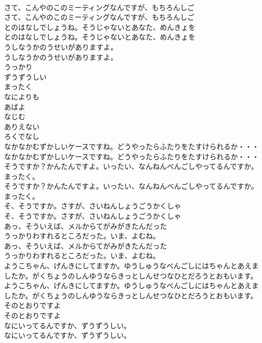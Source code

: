 \documentclass[8pt]{extreport}
\begin{document}
\begin{CJK}{UTF8}{min}
\\	さて、こんやのこのミーティングなんですが、もちろんしご
\\	さて、こんやのこのミーティングなんですが、もちろんしご
\\	とのはなしでしょうね。そうじゃないとあなた、めんきょを
\\	とのはなしでしょうね。そうじゃないとあなた、めんきょを
\\	うしなうかのうせいがありますよ。
\\	うしなうかのうせいがありますよ。
\\	うっかり
\\	ずうずうしい
\\	まったく
\\	なによりも
\\	あばよ
\\	なじむ
\\	ありえない
\\	ろくでなし
\\	なかなかむずかしいケースですね。どうやったらふたりをたすけられるか・・・
\\	なかなかむずかしいケースですね。どうやったらふたりをたすけられるか・・・
\\	そうですか？かんたんですよ。いったい、なんねんべんごしやってるんですか。まったく。
\\	そうですか？かんたんですよ。いったい、なんねんべんごしやってるんですか。まったく。
\\	そ、そうですか。さすが、さいねんしょうごうかくしゃ
\\	そ、そうですか。さすが、さいねんしょうごうかくしゃ
\\	あっ、そういえば、メルからてがみがきたんだった
\\	うっかりわすれるところだった。いま、よむね。
\\	あっ、そういえば、メルからてがみがきたんだった
\\	うっかりわすれるところだった。いま、よむね。
\\	ようこちゃん、げんきにしてますか。ゆうしゅうなべんごしにはちゃんとあえましたか。がくちょうのしんゆうならきっとしんせつなひとだろうとおもいます。
\\	ようこちゃん、げんきにしてますか。ゆうしゅうなべんごしにはちゃんとあえましたか。がくちょうのしんゆうならきっとしんせつなひとだろうとおもいます。
\\	そのとおりですよ
\\	そのとおりですよ
\\	なにいってるんですか、ずうずうしい。
\\	なにいってるんですか、ずうずうしい。

\end{CJK}
\end{document}
